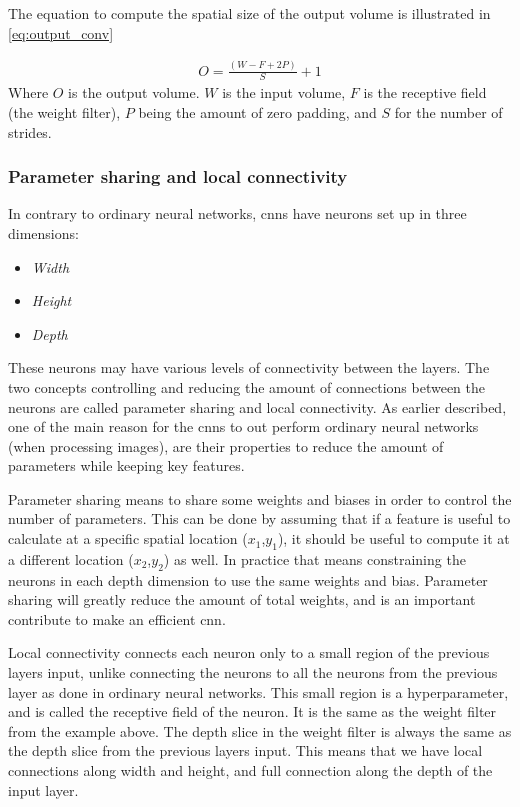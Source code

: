 \documentclass[USenglish]{ifimaster}  %
\begin{document}
The equation to compute the spatial size of the output volume is illustrated in \cref{eq:output_conv}

\begin{equation}\label{eq:output_conv}
\begin{aligned}
O = \frac{(W - F + 2P)}{S}+1
\end{aligned}
\end{equation}
Where $O$ is the output volume. $W$ is the input volume, $F$ is the receptive field (the weight filter), $P$ being the amount of zero padding, and $S$ for the number of strides.
 
\subsubsection{Parameter sharing and local connectivity}
In contrary to ordinary neural networks, \acp{cnn} have neurons set up in three dimensions:
\begin{itemize}
    \item \textit{Width}
    \item \textit{Height}
    \item \textit{Depth}
\end{itemize}
These neurons may have various levels of connectivity between the layers. The two concepts controlling and reducing the amount of connections between the neurons are called parameter sharing and local connectivity. As earlier described, one of the main reason for the \acp{cnn} to out perform ordinary neural networks (when processing images), are their properties to reduce the amount of parameters while keeping key features. 

Parameter sharing means to share some weights and biases in order to control the number of parameters. This can be done by assuming that if a feature is useful to calculate at a specific spatial location ($x_1$,$y_1$), it should be useful to compute it at a different location ($x_2$,$y_2$) as well. In practice that means constraining the neurons in each depth dimension to use the same weights and bias. Parameter sharing will greatly reduce the amount of total weights, and is an important contribute to make an efficient \ac{cnn}. 

Local connectivity connects each neuron only to a small region of the previous layers input, unlike connecting the neurons to all the neurons from the previous layer as done in ordinary neural networks.
This small region is a hyperparameter, and is called the receptive field of the neuron. It is the same as the weight filter from the example above. The depth slice in the weight filter is always the same as the depth slice from the previous layers input. This means that we have local connections along width and height, and full connection along the depth of the input layer.
\end{document}
